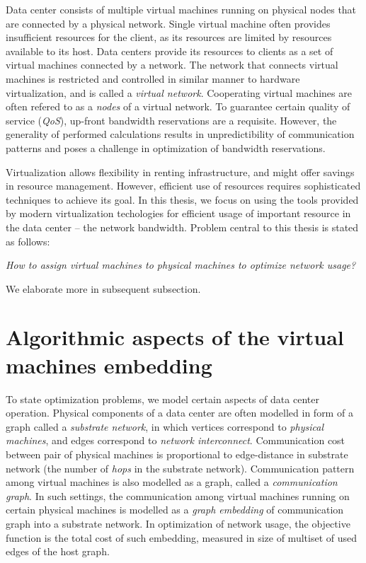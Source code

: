 Data center consists of multiple virtual machines running on physical nodes
that are connected by a physical network. Single virtual machine often provides
insufficient resources for the client, as its resources are limited by resources
available to its host. Data centers provide its resources to clients as a set
of virtual machines connected by a network. The network that connects virtual
machines is restricted and controlled in similar manner to hardware
virtualization, and is called a \emph{virtual network}. Cooperating virtual
machines are often refered to as a \emph{nodes} of a virtual network. To
guarantee certain quality of service (\emph{QoS}), up-front bandwidth
reservations are a requisite. However, the generality of performed calculations
results in unpredictibility of communication patterns and poses a challenge in
optimization of bandwidth reservations.

Virtualization allows
flexibility in renting infrastructure, and might offer savings in resource
management. However, efficient use of resources requires sophisticated
techniques to achieve its goal. In this thesis, we focus on using the tools
provided by modern virtualization techologies for efficient usage of important
resource in the data center -- the network bandwidth. Problem central to this
thesis is stated as follows:

\begin{center}
  \emph{How to assign virtual machines to physical machines to optimize network
  usage?}
\end{center}

We elaborate more in subsequent subsection.

\section{Algorithmic aspects of the virtual machines embedding}

To state optimization problems, we model certain aspects of data center operation.
Physical components of a data center are often modelled in form of a graph called a \emph{substrate network}, in which vertices correspond to \emph{physical machines}, and edges correspond to \emph{network interconnect}.
Communication cost between pair of physical machines is proportional to edge-distance in substrate network (the number of \emph{hops} in the substrate network).
Communication pattern among virtual machines is also modelled as a graph, called a \emph{communication graph}.
In such settings, the communication among virtual machines running on certain physical machines is modelled as a \emph{graph embedding} of communication graph into a substrate network.
In optimization of network usage, the objective function is the total cost of such embedding, measured in size of multiset of used edges of the host graph.

